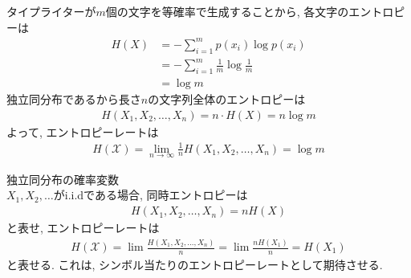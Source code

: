 \documentclass[a4j]{jsarticle}
\begin{document}
 タイプライターが$m$個の文字を等確率で生成することから, 各文字のエントロピーは
\begin{align}
	H(X) & = - \sum_{i=1}^{m} p(x_i)\log p(x_i)            \\
	     & = - \sum_{i=1}^{m} \frac{1}{m} \log \frac{1}{m} \\
	     & = \log m
\end{align}
独立同分布であるから長さ$n$の文字列全体のエントロピーは
\begin{align}
	H(X_1, X_2, \ldots, X_n) = n \cdot H(X) = n \log m
\end{align}
よって, エントロピーレートは
\begin{align}
	H(\mathcal{X}) = \lim_{n \rightarrow \infty} \frac{1}{n} H(X_1, X_2, \ldots, X_n) = \log m
\end{align}


 独立同分布の確率変数\\

$X_1, X_2, \ldots$がi.i.dである場合, 同時エントロピーは
\begin{align}
	H(X_1, X_2, \ldots, X_n) = nH(X)
\end{align}
と表せ, エントロピーレートは
\begin{align}
	H(\mathcal{X}) = \lim \frac{H(X_1, X_2, \ldots, X_n)}{n} = \lim \frac{nH(X_1)}{n} = H(X_1)
\end{align}
と表せる. これは, シンボル当たりのエントロピーレートとして期待させる.\\
\end{document}
